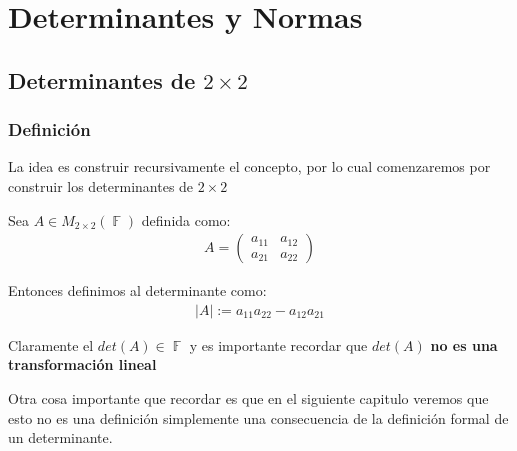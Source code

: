 \documentclass[12pt, fleqn]{report}                             %
\theoremstyle{break}                                            %
\DeclareMathOperator \GenericField {\mathbb{F}}                 %
\newcommand{\pVector}[1]                                        %
        { \ensuremath{\begin{pmatrix}#1\end{pmatrix}} }             %
\begin{document}
\part{Determinantes y Normas}
\clearpage


    \chapter{Determinantes de $2 \times 2$}


        \clearpage
        \section{Definición}

            La idea es construir recursivamente el concepto, por lo
            cual comenzaremos por construir los determinantes de $2 \times 2$

            Sea $A \in M_{2 \times 2}(\GenericField)$ definida como:
            \begin{align*}
                A = \pVector{a_{11} & a_{12} \\ a_{21} & a_{22}}
            \end{align*}

            Entonces definimos al determinante como:
            \begin{align*}
                |A| := a_{11} a_{22} - a_{12} a_{21} 
            \end{align*}

            Claramente el $det(A) \in \GenericField$ y es importante
            recordar que $det(A)$ \textbf{no es una transformación lineal}

            Otra cosa importante que recordar es que en el siguiente capitulo veremos
            que esto no es una definición simplemente una consecuencia de la definición
            formal de un determinante.
\end{document}
